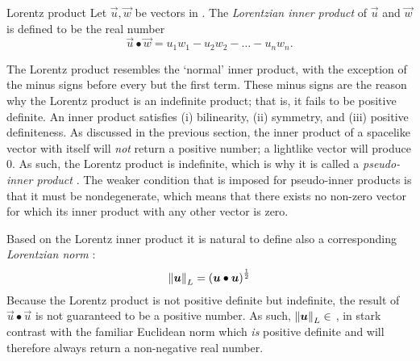\begin{thmblock}{Lorentz product}
    Let \(\vec{u}, \vec{w}\) be vectors in . The \emph{Lorentzian inner product}  of \(\vec{u}\) and \(\vec{w}\) is defined to be the real number
    \begin{equation}
        \vec{u} \bullet \vec{w} = u_1w_1 - u_2w_2 - \ldots - u_nw_n.
        \label{eq:lorentz_product}
    \end{equation}
\end{thmblock}
The Lorentz product resembles the `normal'  inner product, with the exception of the minus signs before every but the first term. These minus signs are the reason why the Lorentz product is an indefinite product; that is, it fails to be positive definite. An inner product satisfies (i) bilinearity, (ii) symmetry, and (iii) positive definiteness. As discussed in the previous section, the inner product of a spacelike vector with itself will \emph{not} return a positive number;  a lightlike vector will produce 0. As such, the Lorentz product is indefinite, which is why it is called a \emph{pseudo-inner product} \cite{Ratcliffe2019,Schuller2014}. The weaker condition that is imposed for pseudo-inner products is that it must be nondegenerate, which means that there exists no non-zero vector for which its inner product with any other vector is zero.

Based on the Lorentz inner product it is natural to define also a corresponding \emph{Lorentzian norm} :
    \[
     \norm{\vb*{u}}_L = \qty(\vb*{u}\bullet\vb*{u})^\frac{1}{2}
\]
Because the Lorentz product is not positive definite but indefinite, the result of \(\vec{u}\bullet\vec{u}\) is not guaranteed to be a positive number. As such, \(\norm{\vb*{u}}_L \in \) , in stark contrast with the familiar Euclidean norm which \emph{is} positive definite and will therefore always return a non-negative real number.

